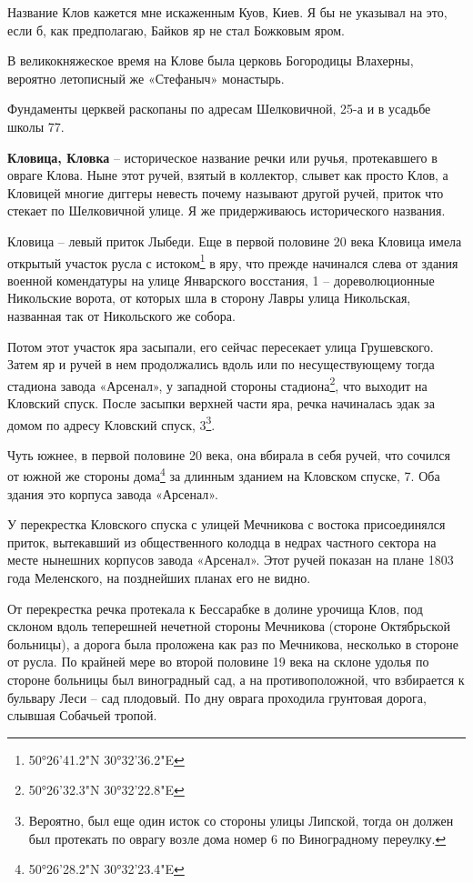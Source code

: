 Название Клов кажется мне искаженным Куов, Киев. Я бы не указывал на это, если б, как предполагаю, Байков яр не стал Божковым яром.

В великокняжеское время на Клове была церковь Богородицы Влахерны, вероятно летописный же «Стефаныч» монастырь. 

Фундаменты церквей раскопаны по адресам Шелковичной, 25-а и в усадьбе школы 77.\\ 

\medskip


\textbf{Кловица, Кловка} – историческое название речки или ручья, протекавшего в овраге Клова. Ныне этот ручей, взятый в коллектор, слывет как просто Клов, а Кловицей многие диггеры невесть почему называют другой ручей, приток что стекает по Шелковичной улице. Я же придерживаюсь исторического названия.

Кловица – левый приток Лыбеди. Еще в первой половине 20 века Кловица имела открытый участок русла с истоком\footnote{50°26'41.2"N 30°32'36.2"E} в яру, что прежде начинался слева от здания военной комендатуры на улице Январского восстания, 1 – дореволюционные Никольские ворота, от которых шла в сторону Лавры улица Никольская, названная так от Никольского же собора.

Потом этот участок яра засыпали, его сейчас пересекает улица Грушевского. Затем яр и ручей в нем продолжались вдоль или по несуществующему тогда стадиона завода «Арсенал», у западной стороны стадиона\footnote{50°26'32.3"N 30°32'22.8"E}, что выходит на Кловский спуск. После засыпки верхней части яра, речка начиналась эдак за домом по адресу Кловский спуск, 3\footnote{Вероятно, был еще один исток со стороны улицы Липской, тогда он должен был протекать по оврагу возле дома номер 6 по Виноградному переулку.}. 

Чуть южнее, в первой половине 20 века, она вбирала в себя ручей, что сочился от южной же стороны дома\footnote{50°26'28.2"N 30°32'23.4"E} за длинным зданием на Кловском спуске, 7. Оба здания это корпуса завода «Арсенал».

У перекрестка Кловского спуска с улицей Мечникова с востока присоединялся приток, вытекавший из общественного колодца в недрах частного сектора на месте нынешних корпусов завода «Арсенал». Этот ручей показан на плане 1803 года Меленского, на позднейших планах его не видно.

От перекрестка речка протекала к Бессарабке в долине урочища Клов, под склоном вдоль теперешней нечетной стороны Мечникова (стороне Октябрьской больницы), а дорога была проложена как раз по Мечникова, несколько в стороне от русла. По крайней мере во второй половине 19 века на склоне удолья по стороне больницы был виноградный сад, а на противоположной, что взбирается к бульвару Леси – сад плодовый. По дну оврага проходила грунтовая дорога, слывшая Собачьей тропой.

